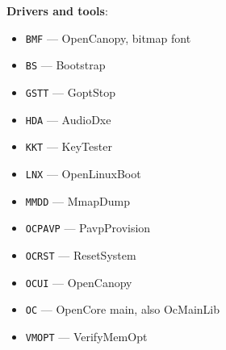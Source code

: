 \documentclass[]{article}
\providecommand{\tightlist}{%
  \setlength{\itemsep}{0pt}\setlength{\parskip}{0pt}}
\begin{document}
\begin{enumerate}
  \textbf{Drivers and tools}:
  \begin{itemize}
  \tightlist
  \item \texttt{BMF} --- OpenCanopy, bitmap font
  \item \texttt{BS} --- Bootstrap
  \item \texttt{GSTT} --- GoptStop
  \item \texttt{HDA} --- AudioDxe
  \item \texttt{KKT} --- KeyTester
  \item \texttt{LNX} --- OpenLinuxBoot
  \item \texttt{MMDD} --- MmapDump
  \item \texttt{OCPAVP} --- PavpProvision
  \item \texttt{OCRST} --- ResetSystem
  \item \texttt{OCUI} --- OpenCanopy
  \item \texttt{OC} --- OpenCore main, also OcMainLib
  \item \texttt{VMOPT} --- VerifyMemOpt
  \end{itemize}


\end{enumerate}
\end{document}
